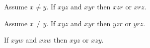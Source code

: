 \documentclass{article}
\newcommand{\Betw}[3]{#1 #2 #3}
\newcommand{\Col}[3]{\operatorname{Col}(#1, #2, #3)}
\newcommand{\OFS}[8]{\operatorname{OFS}
\left(\begin{smallmatrix}%
#1 & #2 & #3 & #4 \\
#5 & #6 & #7 & #8
\end{smallmatrix}\right)%
}
\newcommand{\IFS}[8]{\operatorname{IFS}
\left(\begin{smallmatrix}%
#1 & #2 & #3 & #4 \\
#5 & #6 & #7 & #8
\end{smallmatrix}\right)%
}
\begin{document}
  \begin{forthel}

    \begin{axiom} %
      Assume $x \neq y$.
      If $\Betw{x}{y}{z}$ and $\Betw{x}{y}{r}$
      then $\Betw{x}{z}{r}$ or $\Betw{x}{r}{z}$.
    \end{axiom}

    \begin{lemma} %
      Assume $x \neq y$.
      If $\Betw{x}{y}{z}$ and $\Betw{x}{y}{r}$
      then $\Betw{y}{z}{r}$ or $\Betw{y}{r}{z}$.
    \end{lemma}

    \begin{theorem} %
      If $\Betw{x}{y}{w}$ and $\Betw{x}{z}{w}$ then $\Betw{x}{y}{z}$ or $\Betw{x}{z}{y}$.
    \end{theorem}
  \end{forthel}
\end{document}
